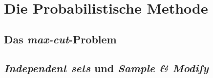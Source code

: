 \section{Die Probabilistische Methode}
\subsection{Das \emph{max-cut}-Problem}
\subsection{\emph{Independent sets} und \emph{Sample \& Modify}}
